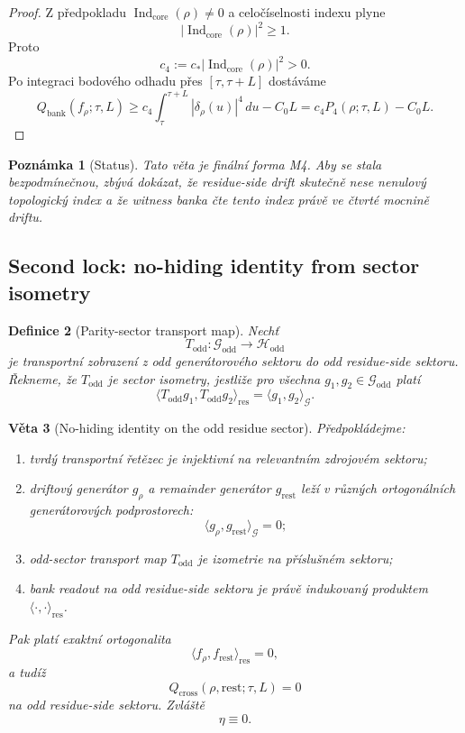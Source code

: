 \documentclass[11pt,a4paper]{article}
\newtheorem{theorem}{Věta}[section]
\newtheorem{definition}[theorem]{Definice}
\newtheorem{remark}[theorem]{Poznámka}
\begin{document}
\begin{proof}
Z předpokladu \(\operatorname{Ind}_{\mathrm{core}}(\rho)\neq 0\) a celočíselnosti indexu plyne
\[
|\operatorname{Ind}_{\mathrm{core}}(\rho)|^2\ge 1.
\]
Proto
\[
c_4:=c_*|\operatorname{Ind}_{\mathrm{core}}(\rho)|^2>0.
\]
Po integraci bodového odhadu přes \([\tau,\tau+L]\) dostáváme
\[
Q_{\mathrm{bank}}(f_\rho;\tau,L)
\ge
c_4\int_{\tau}^{\tau+L} |\delta_\rho(u)|^4\,du-C_0L
=
c_4P_4(\rho;\tau,L)-C_0L.
\]
\end{proof}

\begin{remark}[Status]
Tato věta je finální forma M4.
Aby se stala bezpodmínečnou, zbývá dokázat, že residue-side drift skutečně nese nenulový
topologický index a že witness banka čte tento index právě ve čtvrté mocnině driftu.
\end{remark}

\subsection*{Second lock: no-hiding identity from sector isometry}

\begin{definition}[Parity-sector transport map]
Nechť
\[
T_{\mathrm{odd}}:\mathcal G_{\mathrm{odd}}\to \mathcal H_{\mathrm{odd}}
\]
je transportní zobrazení z odd generátorového sektoru do odd residue-side sektoru.
Řekneme, že \(T_{\mathrm{odd}}\) je \emph{sector isometry}, jestliže pro všechna
\(g_1,g_2\in\mathcal G_{\mathrm{odd}}\) platí
\[
\langle T_{\mathrm{odd}}g_1,T_{\mathrm{odd}}g_2\rangle_{\mathrm{res}}
=
\langle g_1,g_2\rangle_{\mathcal G}.
\]
\end{definition}

\begin{theorem}[No-hiding identity on the odd residue sector]
Předpokládejme:
\begin{enumerate}[label=\textbf{(\arabic*)}]
    \item tvrdý transportní řetězec je injektivní na relevantním zdrojovém sektoru;
    \item driftový generátor \(g_\rho\) a remainder generátor \(g_{\mathrm{rest}}\) leží v různých
    ortogonálních generátorových podprostorech:
    \[
    \langle g_\rho,g_{\mathrm{rest}}\rangle_{\mathcal G}=0;
    \]
    \item odd-sector transport map \(T_{\mathrm{odd}}\) je izometrie na příslušném sektoru;
    \item bank readout na odd residue-side sektoru je právě indukovaný produktem
    \(\langle\cdot,\cdot\rangle_{\mathrm{res}}\).
\end{enumerate}
Pak platí exaktní ortogonalita
\[
\langle f_\rho,f_{\mathrm{rest}}\rangle_{\mathrm{res}}=0,
\]
a tudíž
\[
Q_{\mathrm{cross}}(\rho,\mathrm{rest};\tau,L)=0
\]
na odd residue-side sektoru. Zvláště
\[
\eta\equiv 0.
\]
\end{theorem}
\end{document}
